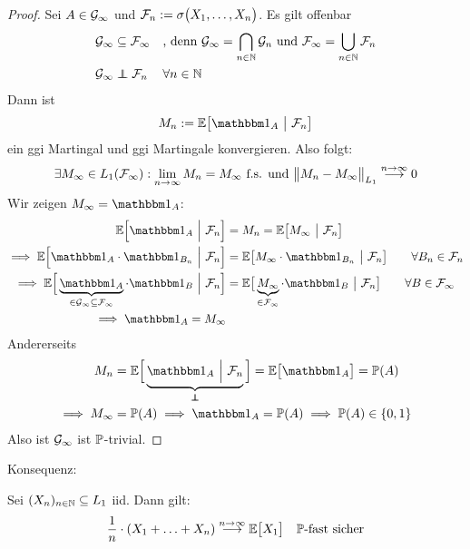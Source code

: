 \begin{proof}
	Sei $A\in\G_\infty$ und $\F_n:=\sigma\big(X_1,\ldots,X_n\big)$. Es gilt offenbar 
	\begin{align*}
		\G_\infty&\subseteq\F_\infty&&\text{, denn }\G_\infty=\bigcap\limits_{n\in\N}\G_n\text{ und }\F_\infty=\bigcup\limits_{n\in\N}\F_n\\
		\G_\infty&\unab\F_n&&\forall n\in\N
	\end{align*}
	Dann ist
	\begin{align*}
		M_n:=\E\big[\indi_A~\big|~\F_n\big]
	\end{align*}
	ein ggi Martingal und ggi Martingale konvergieren. Also folgt:
	\begin{align*}
		\exists M_\infty\in L_1(\F_\infty):\limn M_n=M_\infty\text{ f.s. und }\big\Vert M_n-M_\infty\big\Vert_{L_1}\stackrel{n\to\infty}{\longrightarrow}0
	\end{align*}
	Wir zeigen $M_\infty=\indi_A$:
	\begin{align*}
		\E\Big[\indi_A~\Big|~\F_n\Big]&=M_n=\E\big[M_\infty~\big|~\F_n\big]\\
		\implies
		\E\Big[\indi_A\cdot\indi_{B_n}~\Big|~\F_n\Big]
		&=\E\big[M_\infty\cdot\indi_{B_n}~\big|~\F_n\big]\qquad\forall B_n\in\F_n\\
		\implies
		\E\Big[\underbrace{\indi_A}_{\in\G_\infty\subseteq\F_\infty}\cdot\indi_{B}~\Big|~\F_n\Big]
		&=\E\big[\underbrace{M_\infty}_{\in\F_\infty}\cdot\indi_{B}~\big|~\F_n\big]\qquad\forall B\in\F_\infty\\
		\implies\indi_A=M_\infty
	\end{align*}
	Andererseits
	\begin{align*}
		M_n
		&=\E\Big[\underbrace{\indi_A~\Big|~\F_n}_{\unab}\Big]
		=\E\big[\indi_A\big]
		=\P(A)\\
		\implies M_\infty&=\P(A)\implies\indi_A=\P(A)
		\implies\P(A)\in\lbrace0,1\rbrace
	\end{align*}
	Also ist $\G_\infty$ ist $\P$-trivial.
\end{proof}

Konsequenz:

\begin{theorem}\label{theorem5.7StarkesGesetzDerGrossenZahlen}\enter
	Sei $(X_n)_{n\in\N}\subseteq L_1$ iid. Dann gilt:
	\begin{align*}
		\frac{1}{n}\cdot\left(X_1+\ldots+X_n\right)\stackrel{n\to\infty}{\longrightarrow}\E\big[X_1\big]\quad\P\text{-fast sicher}
	\end{align*}
\end{theorem}

